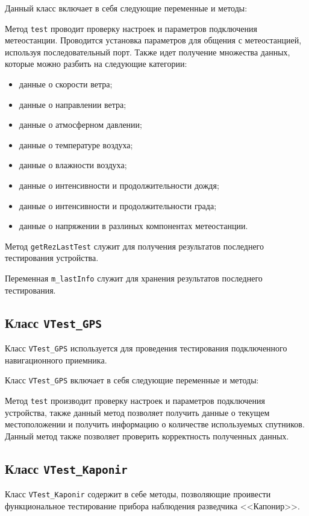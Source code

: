 Данный класс включает в себя следующие переменные и методы:
\begin{enum}
	\item Метод \texttt{test} проводит проверку настроек и параметров подключения метеостанции. Проводится установка
		параметров для общения с метеостанцией, используя последовательный порт. Также идет получение множества
		данных, которые можно разбить на следующие категории:
		\begin{itemize}
			\item данные о скорости ветра;
			\item данные о направлении ветра;
			\item данные о атмосферном давлении;
			\item данные о температуре воздуха;
			\item данные о влажности воздуха;
			\item данные о интенсивности и продолжительности дождя;
			\item данные о интенсивности и продолжительности града;
			\item данные о напряжении в разлиных компонентах метеостанции.
		\end{itemize}
	\item Метод \texttt{getRezLastTest} служит для получения результатов последнего тестирования устройства.
	\item Переменная \texttt{m\_lastInfo} служит для хранения результатов последнего тестирования.
\end{enum}

\subsection{Класс \texttt{VTest\_GPS}}
Класс \texttt{VTest\_GPS} используется для проведения тестирования подключенного навигационного приемника.

Класс \texttt{VTest\_GPS} включает в себя следующие переменные и методы:
\begin{enum}
	\item Метод \texttt{test} производит проверку настроек и параметров подключения устройства, также данный метод
		позволяет получить данные о текущем местоположении и получить информацию о количестве используемых
		спутников. Данный метод также позволяет проверить корректность полученных данных.
\end{enum}


\subsection{Класс \texttt{VTest\_Kaponir}}
Класс \texttt{VTest\_Kaponir} содержит в себе методы, позволяющие проивести функциональное тестирование прибора
наблюдения разведчика <<Капонир>>.


